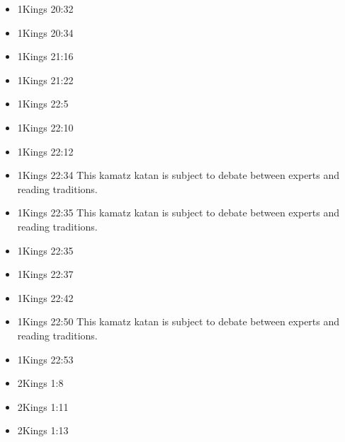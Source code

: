 \documentclass[14pt]{book}
\begin{document}
\begin{multicols}{2}
\begin{itemize}
											\item 1Kings 20:32
											
											\item 1Kings 20:34
											
											\item 1Kings 21:16
											
											\item 1Kings 21:22
											
											\item 1Kings 22:5
											
											\item 1Kings 22:10
											
											\item 1Kings 22:12
											
											\item 1Kings 22:34 This kamatz katan is subject to debate between experts and reading traditions.
											
											\item 1Kings 22:35 This kamatz katan is subject to debate between experts and reading traditions.
											
											\item 1Kings 22:35
											
											\item 1Kings 22:37
											
											\item 1Kings 22:42
											
											\item 1Kings 22:50 This kamatz katan is subject to debate between experts and reading traditions.
											
											\item 1Kings 22:53
											
											\item 2Kings 1:8
											
											\item 2Kings 1:11
											
											\item 2Kings 1:13
											

\end{itemize}
\end{multicols}
\end{document}
